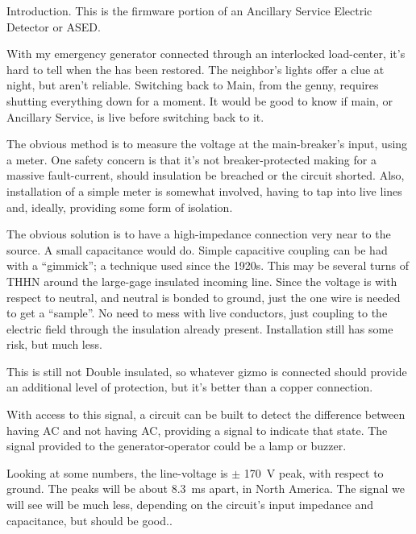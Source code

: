 


\nocon %
\datethis %


Introduction. This is the firmware portion of an Ancillary Service
Electric Detector or ASED.

With my emergency generator connected through an interlocked load-center, it's
hard to tell when the  has been restored.
The neighbor's lights offer a clue at night, but aren't reliable.
Switching back to Main, from the genny, requires shutting  everything down for
a moment.
It would be good to know if main, or Ancillary Service, is live before
switching back to it.

The obvious method is to measure the voltage at the main-breaker's input, using
a meter.
One safety concern is that it's not breaker-protected making for a massive
fault-current, should insulation be breached or the circuit shorted.
Also, installation of a simple meter is somewhat involved, having to tap into
live lines and, ideally, providing some form of isolation.

The obvious solution is to have a high-impedance connection very near to the
source.
A small capacitance would do.
Simple capacitive coupling can be had with a ``gimmick''; a technique used
since the 1920s.
This may be several turns of THHN around the large-gage insulated incoming
line.
Since the voltage is with respect to neutral, and neutral is bonded to ground,
just the one wire is needed to get a ``sample''.
No need to mess with live conductors, just coupling to the electric field
through the insulation already present.
Installation still has some risk, but much less.

This is still not Double insulated, so whatever gizmo is connected should
provide an additional level of protection, but it's better than a copper
connection.

With access to this signal, a circuit can be built to detect the difference
between having AC and not having AC, providing a signal to indicate that state.
The signal provided to the generator-operator could be a lamp or buzzer.

Looking at some numbers, the line-voltage is $\pm$ 170~V peak, with respect to
ground.
The peaks will be about 8.3~ms apart, in North America.
The signal we  will see will be much less, depending on the circuit's input
impedance and capacitance, but should be good..

